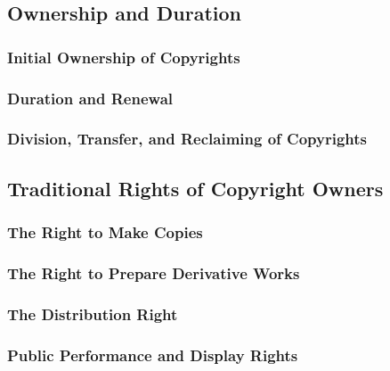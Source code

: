 
\subsection{Ownership and Duration}


\subsubsection{Initial Ownership of Copyrights}


\subsubsection{Duration and Renewal}


\subsubsection{Division, Transfer, and Reclaiming of Copyrights}


\subsection{Traditional Rights of Copyright Owners}


\subsubsection{The Right to Make Copies}


\subsubsection{The Right to Prepare Derivative Works}


\subsubsection{The Distribution Right}


\subsubsection{Public Performance and Display Rights}

